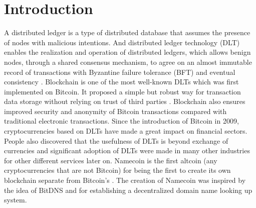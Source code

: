 \section{Introduction}
\label{sec:introduction}

A distributed ledger is a type of distributed database that assumes the presence of nodes with malicious intentions. 
And distributed ledger technology (DLT) enables the realization and operation of distributed ledgers, 
which allows benign nodes, through a shared consensus mechanism, to agree on an almost immutable record of transactions with Byzantine failure tolerance (BFT) and eventual consistency \cite{Sunyaev2020}.
Blockchain is one of the most well-known DLTs which was first implemented on Bitcoin. It proposed a simple but robust way for transaction data storage without relying on trust of third parties \cite{nakamoto2008peer}.
Blockchain also ensures improved security and anonymity of Bitcoin transactions compared with traditional electronic transactions. 
Since the introduction of Bitcoin in 2009, cryptocurrencies based on DLTs have made a great impact on financial sectors. People also discovered that the usefulness of DLTs is beyond exchange of currencies and 
significant adoption of DLTs were made in many other industries for other different services later on. Namecoin is the first altcoin (any cryptocurrencies that are not Bitcoin) for being the first to create its own blockchain separate from Bitcoin's \cite{kalodner2015empirical}. 
The creation of Namecoin was inspired by the idea of BitDNS \cite{merited2010bitdns} and for establishing a decentralized domain name looking up system.
